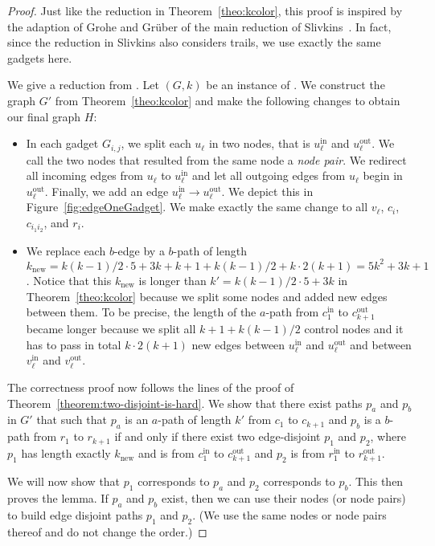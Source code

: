\documentclass[a4paper,english]{lipics-v2016}
\theoremstyle{plain}
\begin{document}
\twoEdgeDisjointPaths*
\begin{proof}
  Just like the reduction in Theorem~\ref{theo:kcolor}, this proof is
  inspired by the adaption of Grohe and Gr\"uber \cite[Lemma
  16]{GroheICALP-07} of the main reduction of Slivkins~\cite{slivkins}. In
  fact, since the reduction in Slivkins also considers trails, we use
  exactly the same gadgets here.  

 We give a reduction
  from \kclique. Let $(G,k)$ be an instance of \kclique.  We construct
  the graph $G'$ from Theorem~\ref{theo:kcolor} and make the following
  changes to obtain our final graph $H$:
\begin{itemize}
\item In each gadget $G_{i,j}$, we split each $u_\ell$ in two nodes, that is $u_\ell^\text{in}$ and $u_\ell^\text{out}$. We call the two nodes that resulted from the same node a \emph{node pair}. We redirect all incoming edges from $u_\ell$ to $u_\ell^\text{in}$ and let all outgoing edges from $u_\ell$ begin in $u_\ell^\text{out}$.  Finally, we add an edge $u_\ell^\text{in} \to u_\ell^\text{out}$.  We depict this in Figure~\ref{fig:edgeOneGadget}.
We make exactly the same change to all $v_\ell$, $c_i$, $c_{i_1i_2}$, and $r_i$. 
\item We replace each $b$-edge by a $b$-path of length $k_\text{new} = k(k-1)/2\cdot 5 + 3k+ k+1+k(k-1)/2 +k \cdot 2(k+1)= 5k^2+3k+1$. Notice that this $k_\text{new}$ is longer than  $k'=k(k-1)/2\cdot 5 + 3k$ in Theorem~\ref{theo:kcolor} because we split some nodes and added new edges between them. To be precise, the length of the $a$-path from $c_1^\text{in}$ to $c_{k+1}^\text{out}$ became longer because we split all $k+1+k(k-1)/2$ control nodes and it has to pass in total $k \cdot 2(k+1)$ new edges between $u_\ell^\text{in}$ and $u_\ell^\text{out}$ and between $v_\ell^\text{in} $ and $v_\ell^\text{out}$. 
\end{itemize}  
The correctness proof now follows the lines of the proof of Theorem~\ref{theorem:two-disjoint-is-hard}. We show that there exist paths $p_a$ and $p_b$ in $G'$ that such that $p_a$ is an $a$-path of length $k'$ from $c_1$ to $c_{k+1}$ and $p_b$ is a $b$-path from $r_1$ to $r_{k+1}$ if and only if there exist two edge-disjoint $p_1$ and $p_2$, where $p_1$ has length exactly $k_\text{new}$ and is from $c_{1}^\text{in}$ to $c_{k+1}^\text{out}$ and $p_2$ is from $r_1^\text{in}$ to $r_{k+1}^\text{out}$. 

We will now show that $p_1$ corresponds to $p_a$ and $p_2$ corresponds to $p_b$. This then proves the lemma. If $p_a$ and $p_b$ exist, then we can use their nodes (or node pairs) to build edge disjoint paths $p_1$ and $p_2$. (We use the same nodes or node pairs thereof and do not change the order.)


\end{proof}
\end{document}
